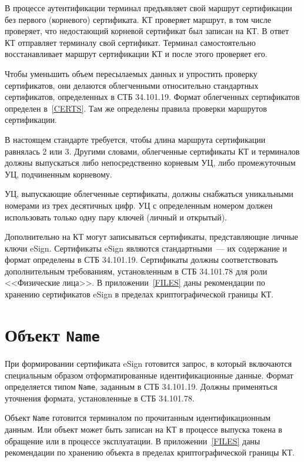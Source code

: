 В процессе аутентификации терминал предъявляет свой маршрут сертификации
без первого (корневого) сертификата. КТ проверяет маршрут, в том числе проверяет,
что недостающий корневой сертификат был записан на КТ.
%
В ответ КТ отправляет терминалу свой сертификат. Терминал самостоятельно
восстанавливает маршрут сертификации КТ и после этого проверяет его.

Чтобы уменьшить объем пересылаемых данных и упростить проверку сертификатов, 
они делаются облегченными относительно стандартных сертификатов, определенных 
в СТБ 34.101.19. Формат облегченных сертификатов определен в~\ref{CERTS}. Там 
же определены правила проверки маршрутов сертификации. 

В настоящем стандарте требуется, чтобы длина маршрута сертификации 
равнялась 2 или 3. Другими словами, облегченные сертификаты КТ и терминалов 
должны выпускаться либо непосредственно корневым УЦ, либо промежуточным УЦ, 
подчиненным корневому. 

УЦ, выпускающие облегченные сертификаты, должны снабжаться уникальными номерами
из трех десятичных цифр. УЦ с определенным номером должен использовать только
одну пару ключей (личный и открытый).

Дополнительно на КТ могут записываться сертификаты, представляющие личные ключи 
eSign. Сертификаты eSign являются стандартными~--- их содержание и формат 
определены в СТБ 34.101.19. Сертификаты должны соответствовать дополнительным 
требованиям, установленным в СТБ 34.101.78 для роли <<Физические лица>>. 
%
В приложении~\ref{FILES} даны рекомендации по хранению сертификатов eSign
в пределах криптографической границы КТ.

\section{Объект \texttt{Name}}\label{OBJ.Name}

При формировании сертификата eSign готовится запрос, в который включаются 
специальным образом отформатированные идентификационные данные. Формат 
определяется типом \texttt{Name}, заданным в СТБ 34.101.19. Должны применяться 
уточнения формата, установленные в СТБ 34.101.78. 

Объект \texttt{Name} готовится терминалом по прочитанным идентификационным данным.
%
Или объект может быть записан на КТ в процессе выпуска токена в обращение или в 
процессе эксплуатации. В приложении~\ref{FILES} даны рекомендации по хранению 
объекта в пределах криптографической границы КТ.

